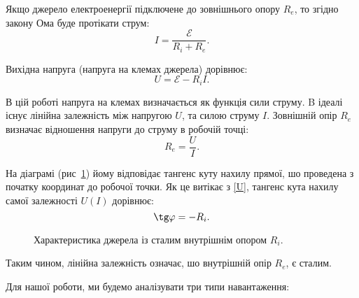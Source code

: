 \documentclass{LabWork}
\begin{document}
Якщо джерело електроенергії підключене до зовнішнього опору $R_e$, то згідно закону Ома буде протікати струм:
\begin{equation}\label{OhmLow}
	I = \frac{\mathcal{E}}{R_i + R_e}.
\end{equation}

Вихідна напруга (напруга на клемах джерела) дорівнює:
\begin{equation}\label{U}
	U = \mathcal{E} - R_i I.
\end{equation}

В цій роботі напруга на клемах визначається як функція сили струму. B ідеалі існує лінійна залежність між напругою $U$, та силою струму $I$. Зов\-ніш\-ній опір $R_e$ визначає відношення напруги до струму в робочій точці:
\begin{equation}\label{Re}
	R_e = \frac{U}{I}.
\end{equation}

На діаграмі (рис~\ref{pic2}) йому відповідає тангенс куту нахилу прямої, шо проведена з початку координат до робочої точки. Як це витікає з \eqref{U}, тангенс кута нахилу самої залежності $U(I)$ дорівнює:
\begin{equation}\label{tan}
	\tg\varphi = - R_i.
\end{equation}

\begin{figure}[h!]\centering
	\caption{Характеристика джерела із сталим внутрішнім опором $R_i$.}
	\label{pic2}
\end{figure}

Таким чином, лінійна залежність означає, шо внутрішній опір $R_e$, є сталим.

Для нашої роботи, ми будемо аналізувати три типи навантаження:
\end{document}
